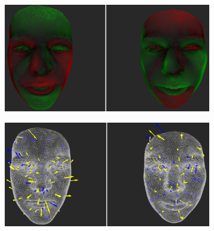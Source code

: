\begin{figure}[h]
\centering
\begin{subfigure}{0.49\textwidth}
\includegraphics[width=\textwidth]{./screenshots/pair12.PNG}
\caption{}
\label{fig:study-4-12}
\end{subfigure}
\begin{subfigure}{0.49\textwidth}
\includegraphics[width=\textwidth]{./screenshots/pair14.PNG}
\caption{}
\label{fig:study-4-14}
\end{subfigure}


\end{figure}
